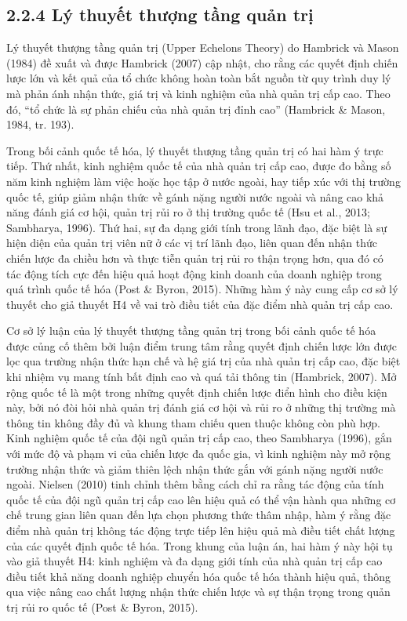 \documentclass[
  a4paper,
  13pt]{extreport}
\begin{document}
\hypertarget{luxfd-thuyux1ebft-thux1b0ux1ee3ng-tux1ea7ng-quux1ea3n-trux1ecb}{%
\subsection{2.2.4 Lý thuyết thượng tầng quản
trị}\label{luxfd-thuyux1ebft-thux1b0ux1ee3ng-tux1ea7ng-quux1ea3n-trux1ecb}}

Lý thuyết thượng tầng quản trị (Upper Echelons Theory) do Hambrick và
Mason (1984) đề xuất và được Hambrick (2007) cập nhật, cho rằng các
quyết định chiến lược lớn và kết quả của tổ chức không hoàn toàn bắt
nguồn từ quy trình duy lý mà phản ánh nhận thức, giá trị và kinh nghiệm
của nhà quản trị cấp cao. Theo đó, ``tổ chức là sự phản chiếu của nhà
quản trị đỉnh cao'' (Hambrick \& Mason, 1984, tr. 193).

Trong bối cảnh quốc tế hóa, lý thuyết thượng tầng quản trị có hai hàm ý
trực tiếp. Thứ nhất, kinh nghiệm quốc tế của nhà quản trị cấp cao, được
đo bằng số năm kinh nghiệm làm việc hoặc học tập ở nước ngoài, hay tiếp
xúc với thị trường quốc tế, giúp giảm nhận thức về gánh nặng người nước
ngoài và nâng cao khả năng đánh giá cơ hội, quản trị rủi ro ở thị trường
quốc tế (Hsu et al., 2013; Sambharya, 1996). Thứ hai, sự đa dạng giới
tính trong lãnh đạo, đặc biệt là sự hiện diện của quản trị viên nữ ở các
vị trí lãnh đạo, liên quan đến nhận thức chiến lược đa chiều hơn và thực
tiễn quản trị rủi ro thận trọng hơn, qua đó có tác động tích cực đến
hiệu quả hoạt động kinh doanh của doanh nghiệp trong quá trình quốc tế
hóa (Post \& Byron, 2015). Những hàm ý này cung cấp cơ sở lý thuyết cho
giả thuyết H4 về vai trò điều tiết của đặc điểm nhà quản trị cấp cao.

Cơ sở lý luận của lý thuyết thượng tầng quản trị trong bối cảnh quốc tế
hóa được củng cố thêm bởi luận điểm trung tâm rằng quyết định chiến lược
lớn được lọc qua trường nhận thức hạn chế và hệ giá trị của nhà quản trị
cấp cao, đặc biệt khi nhiệm vụ mang tính bất định cao và quá tải thông
tin (Hambrick, 2007). Mở rộng quốc tế là một trong những quyết định
chiến lược điển hình cho điều kiện này, bởi nó đòi hỏi nhà quản trị đánh
giá cơ hội và rủi ro ở những thị trường mà thông tin không đầy đủ và
khung tham chiếu quen thuộc không còn phù hợp. Kinh nghiệm quốc tế của
đội ngũ quản trị cấp cao, theo Sambharya (1996), gắn với mức độ và phạm
vi của chiến lược đa quốc gia, vì kinh nghiệm này mở rộng trường nhận
thức và giảm thiên lệch nhận thức gắn với gánh nặng người nước ngoài.
Nielsen (2010) tinh chỉnh thêm bằng cách chỉ ra rằng tác động của tính
quốc tế của đội ngũ quản trị cấp cao lên hiệu quả có thể vận hành qua
những cơ chế trung gian liên quan đến lựa chọn phương thức thâm nhập,
hàm ý rằng đặc điểm nhà quản trị không tác động trực tiếp lên hiệu quả
mà điều tiết chất lượng của các quyết định quốc tế hóa. Trong khung của
luận án, hai hàm ý này hội tụ vào giả thuyết H4: kinh nghiệm và đa dạng
giới tính của nhà quản trị cấp cao điều tiết khả năng doanh nghiệp
chuyển hóa quốc tế hóa thành hiệu quả, thông qua việc nâng cao chất
lượng nhận thức chiến lược và sự thận trọng trong quản trị rủi ro quốc
tế (Post \& Byron, 2015).
\end{document}

